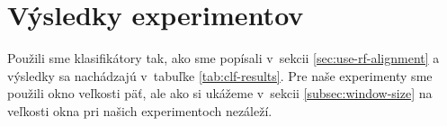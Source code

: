 \section{Výsledky experimentov}


Použili sme klasifikátory tak, ako sme popísali v~sekcii \ref{sec:use-rf-alignment} a výsledky sa nachádzajú v~tabuľke \ref{tab:clf-results}. Pre naše experimenty sme použili okno veľkosti päť, ale ako si ukážeme v~sekcii \ref{subsec:window-size} na veľkosti okna pri našich experimentoch nezáleží.

